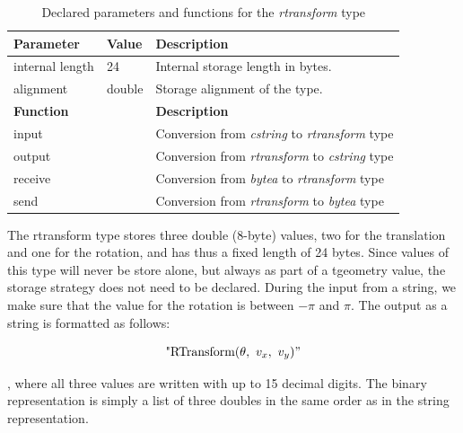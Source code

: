 \begin{table}[h!]
    \centering
    \begin{tabularx}{\textwidth}{|l|l|X|}
    \hline
    \textbf{Parameter}  & \textbf{Value}        & \textbf{Description} \\ 
    \hline
    internal length     & 24                    & Internal storage length in bytes. \\
    \hline
    alignment           & double                & Storage alignment of the type. \\
    \hline
    \multicolumn{2}{|l|}{\textbf{Function}}     & \textbf{Description} \\ 
    \hline
    \multicolumn{2}{|l|}{input}                 & Conversion from \textit{cstring} to \textit{rtransform} type \\
    \hline
    \multicolumn{2}{|l|}{output}                & Conversion from \textit{rtransform} to \textit{cstring} type \\
    \hline
    \multicolumn{2}{|l|}{receive}               & Conversion from \textit{bytea} to \textit{rtransform} type \\
    \hline
    \multicolumn{2}{|l|}{send}                  & Conversion from \textit{rtransform} to \textit{bytea} type \\
    \hline
    \end{tabularx}
    \caption{Declared parameters and functions for the \textit{rtransform} type}
    \label{table:rtransform_type_declaration}
\end{table}

The rtransform type stores three double (8-byte) values, two for the translation and one for the rotation, and has thus a fixed length of 24 bytes. Since values of this type will never be store alone, but always as part of a tgeometry value, the storage strategy does not need to be declared. During the input from a string, we make sure that the value for the rotation is between $-\pi$ and $\pi$. The output as a string is formatted as follows:

\[
    \text{"RTransform(}\theta,\ v_x,\ v_y{)"}
\]

, where all three values are written with up to 15 decimal digits. The binary representation is simply a list of three doubles in the same order as in the string representation.

